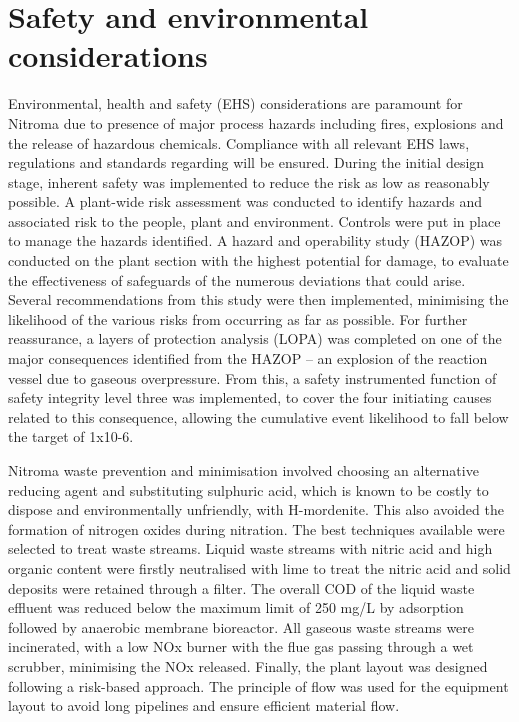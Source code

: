 \section*{Safety and environmental considerations}

Environmental, health and safety (EHS) considerations are paramount for Nitroma due to presence of major process hazards including fires, explosions and the release of hazardous chemicals. Compliance with all relevant EHS laws, regulations and standards regarding will be ensured.  During the initial design stage, inherent safety was implemented to reduce the risk as low as reasonably possible. A plant-wide risk assessment was conducted to identify hazards and associated risk to the people, plant and environment. Controls were put in place to manage the hazards identified. A hazard and operability study (HAZOP) was conducted on the plant section with the highest potential for damage, to evaluate the effectiveness of safeguards of the numerous deviations that could arise. Several recommendations from this study were then implemented, minimising the likelihood of the various risks from occurring as far as possible. For further reassurance, a layers of protection analysis (LOPA) was completed on one of the major consequences identified from the HAZOP – an explosion of the reaction vessel due to gaseous overpressure.  From this, a safety instrumented function of safety integrity level three was implemented, to cover the four initiating causes related to this consequence, allowing the cumulative event likelihood to fall below the target of 1x10-6.  

Nitroma waste prevention and minimisation involved choosing an alternative reducing agent and substituting sulphuric acid, which is known to be costly to dispose and environmentally unfriendly, with H-mordenite. This also avoided the formation of nitrogen oxides during nitration. The best techniques available were selected to treat waste streams. Liquid waste streams with nitric acid and high organic content were firstly neutralised with lime to treat the nitric acid and solid deposits were retained through a filter. The overall COD of the liquid waste effluent was reduced below the maximum limit of 250 mg/L by adsorption followed by anaerobic membrane bioreactor. All gaseous waste streams were incinerated, with a low NOx burner with the flue gas passing through a wet scrubber, minimising the NOx released. Finally, the plant layout was designed following a risk-based approach. The principle of flow was used for the equipment layout to avoid long pipelines and ensure efficient material flow. 